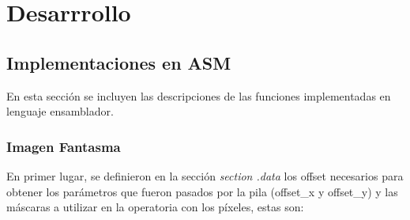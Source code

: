 \documentclass[a4paper]{article}
\begin{document}
\section{Desarrrollo}

\subsection{Implementaciones en ASM}
\justify
En esta sección se incluyen las descripciones de las funciones implementadas en lenguaje ensamblador.

\subsubsection{Imagen Fantasma}
\justify
En primer lugar, se definieron en la sección \textit{section .data} los offset necesarios para obtener los parámetros que fueron pasados por la pila (offset_x y offset_y) y las máscaras a utilizar en la operatoria con los píxeles, estas son:
\end{document}
